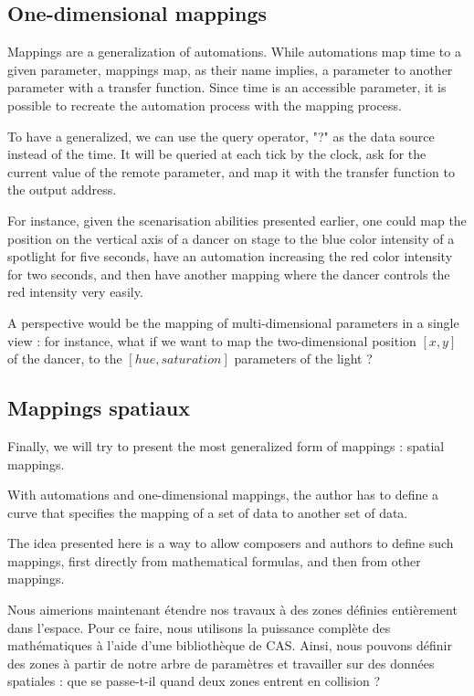 \documentclass{sigchi}
\begin{document}
\subsection{One-dimensional mappings}
Mappings are a generalization of automations. While automations map time to a given parameter, mappings map, as their name implies, a parameter to another parameter with a transfer function. Since time is an accessible parameter, it is possible to recreate the automation process with the mapping process.

To have a generalized, we can use the query operator, "?" as the data source instead of the time. It will be queried at each tick by the clock, ask for the current value of the remote parameter, and map it with the transfer function to the output address.

For instance, given the scenarisation abilities presented earlier, one could map the position on the vertical axis of a dancer on stage to the blue color intensity of a spotlight for five seconds, have an automation increasing the red color intensity for  two seconds, and then have another mapping where the dancer controls the red intensity very easily.

A perspective would be the mapping of multi-dimensional parameters in a single view : for instance, what if we want to map the two-dimensional position $[x, y]$ of the dancer, to the $[hue, saturation]$ parameters of the light ?

\subsection{Mappings spatiaux}
Finally, we will try to present the most generalized form of mappings : spatial mappings.

With automations and one-dimensional mappings, the author has to define a curve that specifies the mapping of a set of data to another set of data.

The idea presented here is a way to allow composers and authors to define such mappings, first directly from mathematical formulas, and then from other mappings.


Nous aimerions maintenant étendre nos travaux à des zones définies entièrement dans l'espace. Pour ce faire, nous utilisons la puissance complète des mathématiques à l'aide d'une bibliothèque de CAS. Ainsi, nous pouvons définir des zones à partir de notre arbre de paramètres et travailler sur des données spatiales : que se passe-t-il quand deux zones entrent en collision ?
    
\end{document}
